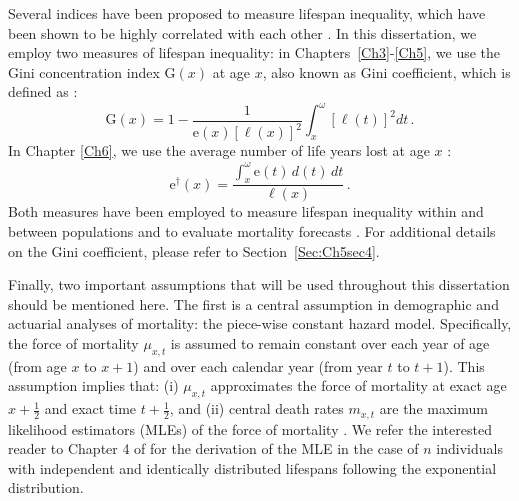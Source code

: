 \documentclass[Thesis]{subfiles}
\begin{document}
Several indices have been proposed to measure lifespan inequality, which have been shown to be highly correlated with each other \cite[see, for example,][]{wilmoth1999rectangularization,vaupel2011life,van2013perturbation,colchero2016emergence}. In this dissertation, we employ two measures of lifespan inequality: in Chapters~\ref{Ch3}-\ref{Ch5}, we use the Gini concentration index $\mathrm{G}(x)$ at age $x$, also known as Gini coefficient, which is defined as \citep{hanada1983formula,shkolnikov2003gini}:
%
\begin{equation}\label{Eq:Ch1GINI}
\mathrm{G}(x) = 1 - \frac{1}{\mathrm{e}(x)\left[\ell(x)\right]^2} \int_{x}^{\omega} \left[\ell(t)\right]^2 dt \, .
\end{equation}
%
In Chapter \ref{Ch6}, we use the average number of life years lost at age $x$ \citep{vaupel2003decomposing}:
%
\begin{equation}\label{Eq:Ch1edag}
\mathrm{e}^{\dagger}(x)= \frac{\int_{x}^{\omega} \mathrm{e}(t) \, d(t) \, dt}{\ell(x)} \, .
\end{equation}
%
Both measures have been employed to measure lifespan inequality within and between populations \cite[see, e.g.,][]{hanada1983formula,shkolnikov2003gini,smits2009length,shkolnikov2011losses,vaupel2011life,van2013perturbation,gigliarano2017longevity,aburto2018lifespan} and to evaluate mortality forecasts \citep{bohk2017lifespan,diaz2018mortality,basellini2019modelling,camarda2019smooth}. For additional details on the Gini coefficient, please refer to Section~\ref{Sec:Ch5sec4}.

Finally, two important assumptions that will be used throughout this dissertation should be mentioned here. The first is a central  assumption in demographic and actuarial analyses of mortality: the piece-wise constant hazard model. Specifically, the force of mortality $\mu_{x,t}$ is assumed to remain constant over each year of age (from age $x$ to $x+1$) and over each calendar year (from year $t$ to $t+1$). This assumption implies that: (i) $\mu_{x,t}$ approximates the force of mortality at exact age $x+\frac{1}{2}$ and exact time $t+\frac{1}{2}$, and (ii) central death rates $m_{x,t}$ are the maximum likelihood estimators (MLEs) of the force of mortality \citep{currie2016fitting}. We refer the interested reader to Chapter 4 of \cite{alho2005statistical} for the derivation of the MLE in the case of $n$ individuals with independent and identically distributed lifespans following the exponential distribution. 
\end{document}
